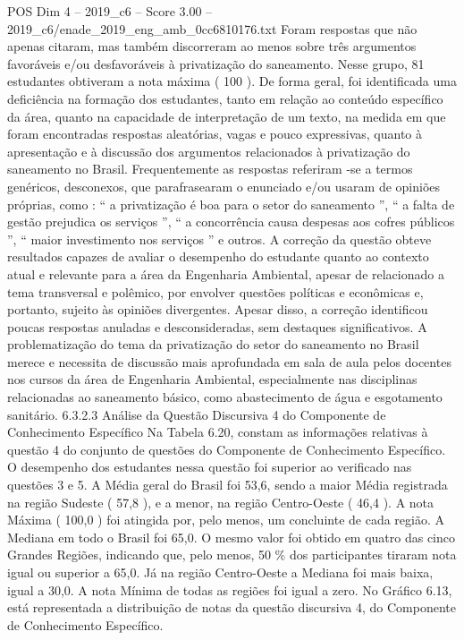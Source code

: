 \begin{textsample}{POS Dim 4 – 2019\_c6 – Score 3.00 – 2019\_c6/enade\_2019\_eng\_amb\_0cc6810176.txt}
Foram respostas que não apenas citaram, mas também discorreram ao menos sobre três argumentos favoráveis e/ou desfavoráveis à privatização do saneamento.
Nesse grupo, 81 estudantes obtiveram a nota máxima ( 100 ).
De forma geral, foi identificada uma deficiência na formação dos estudantes, tanto em relação ao conteúdo específico da área, quanto na capacidade de interpretação de um texto, na medida em que foram encontradas respostas aleatórias, vagas e pouco expressivas, quanto à apresentação e à discussão dos argumentos relacionados à privatização do saneamento no Brasil.
Frequentemente as respostas referiram -se a termos genéricos, desconexos, que parafrasearam o enunciado e/ou usaram de opiniões próprias, como : “ a privatização é boa para o setor do saneamento ”, “ a falta de gestão prejudica os serviços ”, “ a concorrência causa despesas aos cofres públicos ”, “ maior investimento nos serviços ” e outros.
A correção da questão obteve resultados capazes de avaliar o desempenho do estudante quanto ao contexto atual e relevante para a área da Engenharia Ambiental, apesar de relacionado a tema transversal e polêmico, por envolver questões políticas e econômicas e, portanto, sujeito às opiniões divergentes.
Apesar disso, a correção identificou poucas respostas anuladas e desconsideradas, sem destaques significativos.
A problematização do tema da privatização do setor do saneamento no Brasil merece e necessita de discussão mais aprofundada em sala de aula pelos docentes nos cursos da área de Engenharia Ambiental, especialmente nas disciplinas relacionadas ao saneamento básico, como abastecimento de água e esgotamento sanitário. 6.3.2.3 Análise da Questão Discursiva 4 do Componente de Conhecimento Específico Na Tabela 6.20, constam as informações relativas à questão 4 do conjunto de questões do Componente de Conhecimento Específico.
O desempenho dos estudantes nessa questão foi superior ao verificado nas questões 3 e 5.
A Média geral do Brasil foi 53,6, sendo a maior Média registrada na região Sudeste ( 57,8 ), e a menor, na região Centro-Oeste ( 46,4 ).
A nota Máxima ( 100,0 ) foi atingida por, pelo menos, um concluinte de cada região.
A Mediana em todo o Brasil foi 65,0.
O mesmo valor foi obtido em quatro das cinco Grandes Regiões, indicando que, pelo menos, 50 \% dos participantes tiraram nota igual ou superior a 65,0.
Já na região Centro-Oeste a Mediana foi mais baixa, igual a 30,0.
A nota Mínima de todas as regiões foi igual a zero.
No Gráfico 6.13, está representada a distribuição de notas da questão discursiva 4, do Componente de Conhecimento Específico.

\end{textsample}
